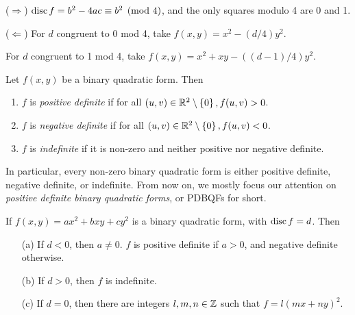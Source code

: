 \documentclass{article}
\begin{document}
\begin{prf}
    ($\Rightarrow$) $\operatorname{disc} f = b^2 - 4ac \equiv b^2 \pmod{4}$, and the only squares modulo 4 are 0 and 1.
    
    ($\Leftarrow$) For $d$ congruent to 0 mod 4, take $f(x, y) = x^2 - (d/4) y^2$.
    
    For $d$ congruent to 1 mod 4, take $f(x, y) = x^2 + xy - ((d-1)/4) y^2$.
\end{prf}

\begin{definition}[Definite]
    Let $f(x, y)$ be a binary quadratic form. Then
    \begin{enumerate}
    	\item $f$ is \textit{positive definite} if for all $(u, v) \in \mathbb{R}^2 \setminus \left\lbrace 0 \right\rbrace, f(u, v) > 0$.
    	\item $f$ is \textit{negative definite} if for all $(u, v) \in \mathbb{R}^2 \setminus \left\lbrace 0 \right\rbrace, f(u, v) < 0$.
    	\item $f$ is \textit{indefinite} if it is non-zero and neither positive nor negative definite.
	\end{enumerate}
\end{definition}

In particular, every non-zero binary quadratic form is either positive definite, negative definite, or indefinite. From now on, we mostly focus our attention on \textit{positive definite binary quadratic forms}, or PDBQFs for short.

\begin{proposition}[Definite]
	If $f(x, y) = ax^2 + bxy + cy^2$ is a binary quadratic form, with $\operatorname{disc} f = d$. Then
	\begin{enumerate}
    	\item[(a)] If $d < 0$, then $a \neq 0$. $f$ is positive definite if $a > 0$, and negative definite otherwise.
    	\item[(b)] If $d > 0$, then $f$ is indefinite.
    	\item[(c)] If $d = 0$, then there are integers $l, m, n \in \mathbb{Z}$ such that $f = l(mx + ny)^2$.
	\end{enumerate}
\end{proposition}
\end{document}
